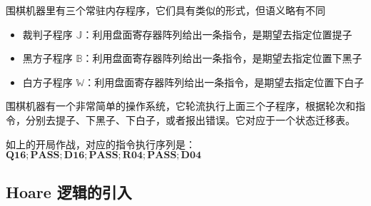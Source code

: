 围棋机器里有三个常驻内存程序，它们具有类似的形式，但语义略有不同

\begin{itemize}
    \item 裁判子程序 $\mathbb{J}$：利用盘面寄存器阵列给出一条指令，是期望去指定位置提子
    \item 黑方子程序 $\mathbb{B}$：利用盘面寄存器阵列给出一条指令，是期望去指定位置下黑子
    \item 白方子程序 $\mathbb{W}$：利用盘面寄存器阵列给出一条指令，是期望去指定位置下白子
\end{itemize}

围棋机器有一个非常简单的操作系统，它轮流执行上面三个子程序，根据轮次和指令，分别去提子、下黑子、下白子，或者报出错误。它对应于一个状态迁移表。

如上的开局作战，对应的指令执行序列是：$\mathbf{Q16; PASS; D16; PASS; R04; PASS; D04}$

\subsection{Hoare 逻辑的引入}

















